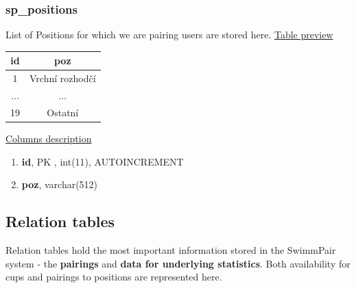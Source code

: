 \subsubsection*{sp\_positions}
List of Positions for which we are pairing users are stored here.
\newline
\underline{Table preview}
\begin{center}
 \begin{tabular}{||c c||} 
 \hline
 id & poz  \\ [0.5ex] 
 \hline\hline
 1 & Vrchní rozhodčí \\ 
 \hline
 ... & ...  \\ [0.5ex]
\hline
 19 & Ostatní  \\
 \hline
\end{tabular}
\end{center}
\underline{Columns description}
\begin{enumerate}
  \setlength\itemsep{0em}
  \item \textbf{id}, PK , int(11), AUTOINCREMENT
  \item \textbf{poz}, varchar(512)
\end{enumerate}

\subsection{Relation tables}
Relation tables hold the most important information stored in the SwimmPair system - the \textbf{pairings} and \textbf{data for underlying statistics}. Both availability for cups and pairings to positions are represented here.
